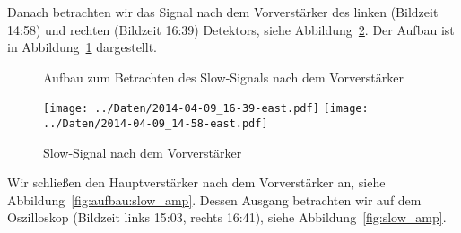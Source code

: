 Danach betrachten wir das Signal nach dem Vorverstärker des linken (Bildzeit
14:58) und rechten (Bildzeit 16:39) Detektors, siehe
Abbildung~\ref{fig:slow_pre_amp}. Der Aufbau ist in
Abbildung~\ref{fig:aufbau:slow_pre} dargestellt.

\begin{figure}[htbp]
    \centering
    \caption{%
        Aufbau zum Betrachten des Slow-Signals nach dem Vorverstärker
    }
    \label{fig:aufbau:slow_pre}
\end{figure}

\begin{figure}[htbp]
    \centering
    \texttt{[image: ../Daten/2014-04-09\_16-39-east.pdf]}
    \hfill
    \texttt{[image: ../Daten/2014-04-09\_14-58-east.pdf]}
    \caption{%
        Slow-Signal nach dem Vorverstärker
    }
    \label{fig:slow_pre_amp}
\end{figure}

Wir schließen den Hauptverstärker nach dem Vorverstärker an, siehe
Abbildung~\ref{fig:aufbau:slow_amp}. Dessen Ausgang betrachten wir auf dem
Oszilloskop (Bildzeit links 15:03, rechts 16:41), siehe
Abbildung~\ref{fig:slow_amp}.

